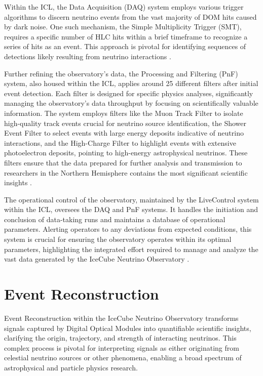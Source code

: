 Within the ICL, the Data Acquisition (DAQ) system employs various trigger algorithms to discern neutrino events from the vast majority of DOM hits caused by dark noise.
One such mechanism, the Simple Multiplicity Trigger (SMT), requires a specific number of HLC hits within a brief timeframe to recognize a series of hits as an event.
This approach is pivotal for identifying sequences of detections likely resulting from neutrino interactions \cite{IC3_thedetector}.

Further refining the observatory's data, the Processing and Filtering (PnF) system, also housed within the ICL, applies around 25 different filters after initial event detection.
Each filter is designed for specific physics analyses, significantly managing the observatory's data throughput by focusing on scientifically valuable information.
The system employs filters like the Muon Track Filter to isolate high-quality track events crucial for neutrino source identification, the Shower Event Filter to select events with large energy deposits indicative of neutrino interactions, and the High-Charge Filter to highlight events with extensive photoelectron deposits, pointing to high-energy astrophysical neutrinos.
These filters ensure that the data prepared for further analysis and transmission to researchers in the Northern Hemisphere contains the most significant scientific insights \cite{IC3_thedetector}.

The operational control of the observatory, maintained by the LiveControl system within the ICL, oversees the DAQ and PnF systems.
It handles the initiation and conclusion of data-taking runs and maintains a database of operational parameters.
Alerting operators to any deviations from expected conditions, this system is crucial for ensuring the observatory operates within its optimal parameters, highlighting the integrated effort required to manage and analyze the vast data generated by the IceCube Neutrino Observatory \cite{IC3_thedetector}.

\section{Event Reconstruction}
Event Reconstruction within the IceCube Neutrino Observatory transforms signals captured by Digital Optical Modules into quantifiable scientific insights, clarifying the origin, trajectory, and strength of interacting neutrinos. This complex process is pivotal for interpreting signals as either originating from celestial neutrino sources or other phenomena, enabling a broad spectrum of astrophysical and particle physics research.

